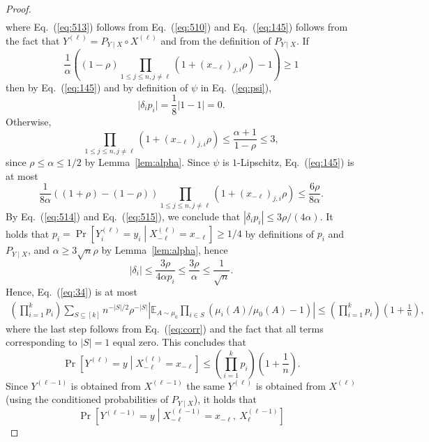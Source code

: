 \documentclass[final, 12pt]{colt2018}
\renewcommand{\eqref}[1]{Eq.~(\ref{#1})}
\newcommand{\lemref}[1]{Lemma~\ref{#1}}
\begin{document}
\begin{proof}
\begin{align}
\end{align}
where \eqref{eq:513} follows from \eqref{eq:510} and \eqref{eq:145} follows from the fact that $Y^{(\ell)} = P_{Y\mid X} \circ X^{(\ell)}$ and from the definition of $P_{Y \mid X}$.
If 
\[
\frac{1}{\alpha} \left( (1 - \rho)\prod_{1 \le j \le n, j \ne \ell} (1 + (x_{-\ell})_{j,i} \rho) -1 \right) \ge 1
\]
then by \eqref{eq:145} and by definition of $\psi$ in \eqref{eq:psi},
\begin{equation}\label{eq:514}
\lvert \delta_i p_i \rvert = \frac{1}{8}\left| 1 - 1 \right| = 0.
\end{equation}
Otherwise, 
\[
\prod_{1 \le j \le n, j \ne \ell} (1 + (x_{-\ell})_{j,i} \rho)
\le \frac{\alpha + 1}{1-\rho}
\le 3,
\]
since $\rho \le \alpha \le 1/2$ by \lemref{lem:alpha}. Since $\psi$ is $1$-Lipschitz, \eqref{eq:145} is at most
\begin{equation} \label{eq:515}
\frac{1}{8 \alpha}((1+ \rho) - (1 - \rho)) \prod_{1 \le j \le n, j \ne \ell} (1 + (x_{-\ell})_{j,i} \rho)
\le \frac{6 \rho}{8 \alpha}.
\end{equation}
By \eqref{eq:514} and \eqref{eq:515}, we conclude that $|\delta_i p_i| \le 3\rho/(4\alpha)$. It holds that $p_i = \Pr\left[Y^{(\ell)}_i = y_i \middle| X^{(\ell)}_{-\ell} = x_{-\ell}\right] \ge 1/4$ by definitions of $p_i$ and $P_{Y \mid X}$, and $\alpha \ge 3 \sqrt{n}\rho$ by \lemref{lem:alpha}, hence
\[|\delta_i| \le \frac{3\rho}{4 \alpha p_i} \le \frac{3 \rho}{\alpha} \le \frac{1}{\sqrt{n}}. \]
Hence, \eqref{eq:34} is at most
\begin{align*}
\left(\prod_{i=1}^k p_i \right) \sum_{S \subseteq [k]} n^{-\lvert S \rvert/2} \rho^{-\lvert S \rvert} \left\lvert \mathbb{E}_{A \sim \mu_0} \prod_{i\in S} (\mu_i(A)/\mu_0(A) - 1) \right\rvert
\le \left(\prod_{i=1}^k p_i \right) \left( 1 + \frac{1}{n} \right),
\end{align*}
where the last step follows from \eqref{eq:corr} and the fact that all terms corresponding to $\lvert S \rvert = 1$ equal zero.
This concludes that 
\begin{equation}\label{eq:523}
\Pr\left[Y^{(\ell)} = y \middle| X^{(\ell)}_{-\ell} = x_{-\ell}\right] \le \left(\prod_{i=1}^k p_i \right) \left(1 + \frac{1}{n}\right).
\end{equation}
Since $Y^{(\ell-1)}$ is obtained from $X^{(\ell-1)}$ the same $Y^{(\ell)}$ is obtained from $X^{(\ell)}$ (using the conditioned probabilities of $P_{Y\mid X}$), it holds that
\begin{equation} \label{eq:518}
\Pr\left[Y^{(\ell-1)} = y \middle| X^{(\ell-1)}_{-\ell} = x_{-\ell},\ X^{(\ell-1)}_\ell \right]

\end{equation}
\end{proof}
\end{document}
